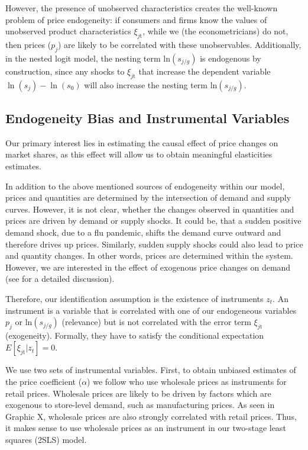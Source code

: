 \documentclass[12pt, authoryear]{elsarticle}
\begin{document}
 However, the presence of unobserved characteristics creates the well-known problem of price endogeneity: if consumers and firms know the values of unobserved product characteristics  $\xi _ { j \mathrm { t } }$, while we (the econometricians) do not, then prices ($p_j$) are likely to be correlated with these unobservables. Additionally, in the nested logit model, the  nesting term ln$\left( s _ { j / g  } \right)$ is endogenous by construction, since any shocks to $\xi _ { j \mathrm { t } }$ that increase the dependent variable $\ln \left( s _ { j } \right) - \ln \left( s _ { 0 } \right)$  will also increase the nesting term ln$\left( s _ { j / g  } \right)$.

\subsection{Endogeneity Bias and Instrumental Variables}

Our primary interest lies in estimating the  causal effect of price changes on market shares, as this effect will allow us to obtain meaningful elasticities estimates. 

In addition to the above mentioned sources of endogeneity within our model, prices and quantities are determined by the intersection of demand and supply curves. However, it is not clear, whether the changes observed in quantities and prices are driven by demand or supply shocks. It could be, that a sudden positive demand shock, due to a flu pandemic, shifts the demand curve outward and therefore drives up prices. Similarly, sudden supply shocks could also lead to price and quantity changes. In other words, prices are determined within the system. However, we are interested in the effect of exogenous price changes on demand (see \cite{angrist2008mostly} for a detailed discussion).

Therefore, our identification assumption is the existence of instruments $z_t$.  An instrument is a variable that is correlated with one of our endogeneous variables $p_{ j }$ or  ln$\left( s _ { j / g  } \right)$ (relevance) but is not correlated with the error term $\xi _ { j \mathrm { t } }$  (exogeneity). Formally, they have to satisfy the conditional  expectation $E[\xi _ { j \mathrm { t } } \lvert z_t ] = 0$.

We use two sets of instrumental variables. First, to obtain unbiased estimates of the price coefficient ($\alpha$) we follow \cite{chintagunta_balancing_2003} who use wholesale prices as instruments for retail prices. Wholesale prices are likely to be driven by factors which are exogenous to store-level demand, such as manufacturing prices. As seen in Graphic X, wholesale prices are also strongly correlated with retail prices. Thus, it makes sense to use wholesale prices as an instrument in our two-stage least squares (2SLS) model. 
\end{document}
